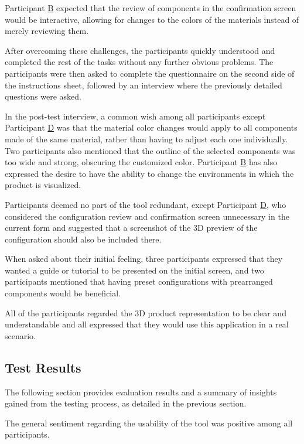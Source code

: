 Participant \hyperref[itm:B]{B} expected that the review of components in the confirmation screen would be interactive, allowing for changes to the colors of the materials instead of merely reviewing them.

After overcoming these challenges, the participants quickly understood and completed the rest of the tasks without any further obvious problems. The participants were then asked to complete the  questionnaire on the second side of the instructions sheet, followed by an interview where the previously detailed questions were asked.

In the post-test interview, a common wish among all participants except Participant \hyperref[itm:D]{D} was that the material color changes would apply to all components made of the same material, rather than having to adjust each one individually. Two participants also mentioned that the outline of the selected components was too wide and strong, obscuring the customized color. Participant \hyperref[itm:B]{B} has also expressed the desire to have the ability to change the environments in which the product is visualized.

Participants deemed no part of the tool redundant, except Participant \hyperref[itm:D]{D}, who considered the configuration review and confirmation screen unnecessary in the current form and suggested that a screenshot of the 3D preview of the configuration should also be included there.

When asked about their initial feeling, three participants expressed that they wanted a guide or tutorial to be presented on the initial screen, and two participants mentioned that having preset configurations with prearranged components would be beneficial.  

All of the participants regarded the 3D product representation to be clear and understandable and all expressed that they would use this application in a real scenario.

\subsection{Test Results}

The following section provides evaluation results and a summary of insights gained from the testing process, as detailed in the previous section.

The general sentiment regarding the usability of the tool was positive among all participants.

